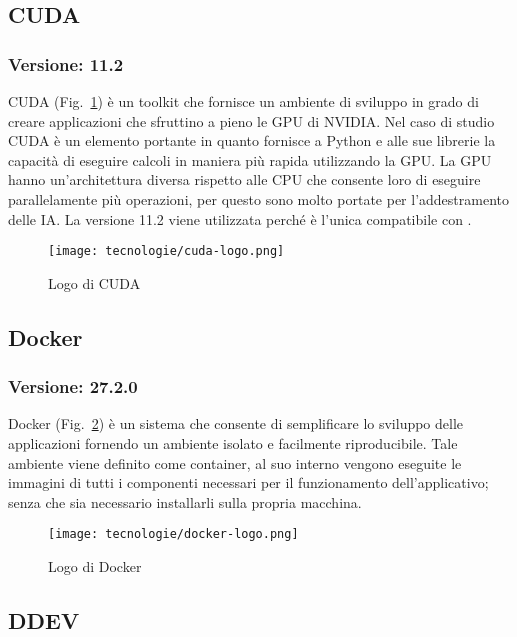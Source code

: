 \subsection{\label{tec:cuda}CUDA}
\subsubsection{Versione: 11.2}
CUDA (Fig.~\ref{fig:logo-cuda}) è un toolkit che fornisce un ambiente di sviluppo in grado di creare applicazioni che sfruttino a pieno le GPU di NVIDIA.
Nel caso di studio CUDA è un elemento portante in quanto fornisce a Python e alle sue librerie la capacità di eseguire calcoli in maniera più rapida utilizzando la GPU.
La GPU hanno un'architettura diversa rispetto alle CPU che consente loro di eseguire parallelamente più operazioni, per questo sono molto portate per l'addestramento delle IA.
La versione 11.2 viene utilizzata perché è l'unica compatibile con .

\begin{figure}[!h] 
  \centering 
  \texttt{[image: tecnologie/cuda-logo.png]} 
  \caption{Logo di CUDA}
  \label{fig:logo-cuda}
\end{figure}

\newpage

\subsection{\label{tec:docker}Docker}
\subsubsection{Versione: 27.2.0}
Docker (Fig.~\ref{fig:logo-docker}) è un sistema che consente di semplificare lo sviluppo delle applicazioni fornendo un ambiente isolato e facilmente riproducibile. Tale ambiente viene definito come container, al suo interno vengono eseguite le immagini di tutti i componenti necessari per il funzionamento dell'applicativo; senza che sia necessario installarli sulla propria macchina.

\begin{figure}[!h] 
  \centering 
  \texttt{[image: tecnologie/docker-logo.png]} 
  \caption{Logo di Docker}
  \label{fig:logo-docker}
\end{figure}


\subsection{\label{tec:ddev}DDEV}

